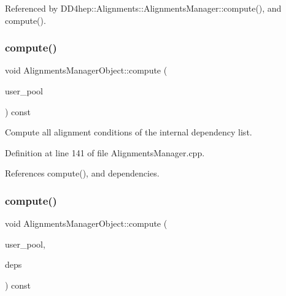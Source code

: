 Referenced by D\+D4hep\+::\+Alignments\+::\+Alignments\+Manager\+::compute(), and compute().

\hypertarget{class_d_d4hep_1_1_alignments_1_1_alignments_manager_object_a2887ad4a43e73c3632d0e3b45c62ba30}{}\label{class_d_d4hep_1_1_alignments_1_1_alignments_manager_object_a2887ad4a43e73c3632d0e3b45c62ba30} 
\subsubsection{\texorpdfstring{compute()}{compute()}\hspace{0.1cm}{\footnotesize\ttfamily [2/3]}}
{\footnotesize\ttfamily void Alignments\+Manager\+Object\+::compute (\begin{DoxyParamCaption}\item[{\hyperlink{class_d_d4hep_1_1_conditions_1_1_user_pool}{User\+Pool} \&}]{user\+\_\+pool }\end{DoxyParamCaption}) const}



Compute all alignment conditions of the internal dependency list. 



Definition at line 141 of file Alignments\+Manager.\+cpp.



References compute(), and dependencies.

\hypertarget{class_d_d4hep_1_1_alignments_1_1_alignments_manager_object_a87b8168925305197cf28ae760e8a86b5}{}\label{class_d_d4hep_1_1_alignments_1_1_alignments_manager_object_a87b8168925305197cf28ae760e8a86b5} 
\subsubsection{\texorpdfstring{compute()}{compute()}\hspace{0.1cm}{\footnotesize\ttfamily [3/3]}}
{\footnotesize\ttfamily void Alignments\+Manager\+Object\+::compute (\begin{DoxyParamCaption}\item[{\hyperlink{class_d_d4hep_1_1_conditions_1_1_user_pool}{User\+Pool} \&}]{user\+\_\+pool,  }\item[{const \hyperlink{class_d_d4hep_1_1_alignments_1_1_alignments_manager_object_a833ee244e731bbe8cf28bb209181dabc}{Dependencies} \&}]{deps }\end{DoxyParamCaption}) const}



